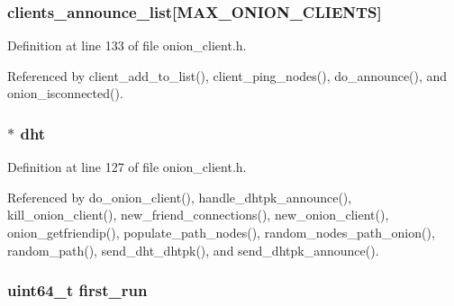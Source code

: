 \hypertarget{struct_onion___client_a21a83b6615ce3ab53739031a355aeabd}{
\subsubsection[{clients\+\_\+announce\+\_\+list}]{ clients\+\_\+announce\+\_\+list\mbox{[}{\bf M\+A\+X\+\_\+\+O\+N\+I\+O\+N\+\_\+\+C\+L\+I\+E\+N\+T\+S}\mbox{]}}}\label{struct_onion___client_a21a83b6615ce3ab53739031a355aeabd}


Definition at line 133 of file onion\+\_\+client.\+h.



Referenced by client\+\_\+add\+\_\+to\+\_\+list(), client\+\_\+ping\+\_\+nodes(), do\+\_\+announce(), and onion\+\_\+isconnected().

\hypertarget{struct_onion___client_a8b3d6ce8745acc52695e252bdb1531b6}{
\subsubsection[{dht}]{$\ast$ dht}}\label{struct_onion___client_a8b3d6ce8745acc52695e252bdb1531b6}


Definition at line 127 of file onion\+\_\+client.\+h.



Referenced by do\+\_\+onion\+\_\+client(), handle\+\_\+dhtpk\+\_\+announce(), kill\+\_\+onion\+\_\+client(), new\+\_\+friend\+\_\+connections(), new\+\_\+onion\+\_\+client(), onion\+\_\+getfriendip(), populate\+\_\+path\+\_\+nodes(), random\+\_\+nodes\+\_\+path\+\_\+onion(), random\+\_\+path(), send\+\_\+dht\+\_\+dhtpk(), and send\+\_\+dhtpk\+\_\+announce().

\hypertarget{struct_onion___client_abd365b47c75ee96603245d7137d6e21c}{
\subsubsection[{first\+\_\+run}]{\setlength{\rightskip}{0pt plus 5cm}uint64\+\_\+t first\+\_\+run}}\label{struct_onion___client_abd365b47c75ee96603245d7137d6e21c}


